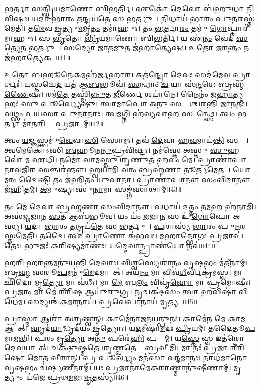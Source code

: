 \ul{𑌭}𑌰𑍍𑌤𑌾 𑌸\ul{𑌨𑍍𑌭𑍍𑌰𑌿}𑌯𑌮𑌾॑𑌣𑍋 𑌬𑌿𑌭𑌰𑍍𑌤𑌿। 
𑌏𑌕𑍋॑ \ul{𑌦𑍇}𑌵𑍋 𑌬॑\ul{𑌹𑍁}𑌧𑌾 𑌨𑌿𑌵𑌿॑𑌷𑍍𑌟𑌃। 
\ul{𑌯}𑌦𑌾 \ul{𑌭𑌾}𑌰𑌂 \ul{𑌤}𑌨𑍍𑌦𑍍𑌰𑌯॑\ul{𑌤𑍇} 𑌸 𑌭𑌰𑍍𑌤𑍁𑌮𑍍᳚। 
\ul{𑌨𑌿}𑌧𑌾𑌯॑ \ul{𑌭𑌾}𑌰𑌂 𑌪𑍁\ul{𑌨}𑌰𑌸𑍍𑌤॑𑌮𑍇𑌤𑌿। 
𑌤\ul{𑌮𑍇}𑌵 \ul{𑌮𑍃}𑌤𑍍𑌯𑍁\ul{𑌮}𑌮𑍃\ul{𑌤𑌂} 𑌤𑌮𑌾॑𑌹𑍁𑌃। 
𑌤𑌂 \ul{𑌭}𑌰𑍍𑌤𑌾\ul{𑌰𑌂} 𑌤𑌮𑍁॑ \ul{𑌗𑍋}𑌪𑍍𑌤𑌾𑌰॑𑌮𑌾𑌹𑍁𑌃। 
𑌸 \ul{𑌭𑍃}𑌤𑍋 \ul{𑌭𑍍𑌰𑌿}𑌯𑌮𑌾॑𑌣𑍋 𑌬𑌿𑌭𑌰𑍍𑌤𑌿। 
𑌯 𑌏॑\ul{𑌨𑌂} 𑌵𑍇𑌦॑ \ul{𑌸}𑌤𑍍𑌯𑍇\ul{𑌨} 𑌭𑌰𑍍𑌤𑍁𑌮𑍍᳚। 
\ul{𑌸}𑌦𑍍𑌯𑍋 \ul{𑌜𑌾}𑌤\ul{𑌮𑍁}𑌤 𑌜॑𑌹𑌾\ul{𑌤𑍍𑌯𑍇}𑌷𑌃। 
\ul{𑌉}𑌤𑍋 𑌜𑌰॑\ul{𑌨𑍍𑌤𑌂} 𑌨 𑌜॑\ul{𑌹𑌾}𑌤𑍍𑌯𑍇𑌕𑌮𑍍᳚॥41॥

\ul{𑌉}𑌤𑍋 \ul{𑌬}𑌹𑍂𑌨𑍇\ul{𑌕}𑌮𑌹॑𑌰𑍍𑌜𑌹𑌾𑌰। 
𑌅𑌤॑𑌨𑍍𑌦𑍍𑌰𑍋 \ul{𑌦𑍇}𑌵𑌃 𑌸𑌦॑\ul{𑌮𑍇}𑌵 𑌪𑍍𑌰𑌾𑌰𑍍𑌥𑌃॑। 
𑌯𑌸𑍍𑌤𑌦𑍍𑌵𑍇\ul{𑌦} 𑌯𑌤॑ 𑌆\ul{𑌬}𑌭𑍂𑌵॑। 
\ul{𑌸}𑌨𑍍𑌧𑌾𑌂 \ul{𑌚} 𑌯𑌾 𑌸॑\ul{𑌨𑍍𑌦}𑌧𑍇 𑌬𑍍𑌰𑌹𑍍𑌮॑\ul{𑌣𑍈}𑌷𑌃। 
𑌰𑌮॑\ul{𑌤𑍇} 𑌤𑌸𑍍𑌮𑌿॑\ul{𑌨𑍍𑌨𑍁}𑌤 \ul{𑌜𑍀}𑌰𑍍𑌣𑍇 𑌶𑌯𑌾॑𑌨𑍇। 
𑌨𑍈𑌨𑌂॑ 𑌜\ul{𑌹𑌾}𑌤𑍍𑌯𑌹𑌃॑ 𑌸𑍁 \ul{𑌪𑍂}𑌰𑍍𑌵𑍍𑌯𑍇𑌷𑍁॑। 
𑌤𑍍𑌵𑌾𑌮𑌾\ul{𑌪𑍋} 𑌅\ul{𑌨𑍁} 𑌸𑌰𑍍𑌵𑌾᳚𑌶𑍍𑌚𑌰𑌨𑍍𑌤𑌿 𑌜𑌾\ul{𑌨}𑌤𑍀𑌃। 
\ul{𑌵}𑌥𑍍𑌸𑌂 𑌪𑌯॑𑌸𑌾 𑌪𑍁\ul{𑌨𑌾}𑌨𑌾𑌃। 
𑌤𑍍𑌵\ul{𑌮}𑌗𑍍𑌨𑌿 𑌹॑\ul{𑌵𑍍𑌯}𑌵𑌾\ul{𑌹}\ul{} 𑌸𑌮𑌿᳚𑌨𑍍𑌥𑍍𑌸𑍇। 
𑌤𑍍𑌵𑌂 \ul{𑌭}𑌰𑍍𑌤𑌾 𑌮𑌾॑\ul{𑌤}𑌰𑌿𑌶𑍍𑌵𑌾᳚ \ul{𑌪𑍍𑌰}𑌜𑌾𑌨𑌾᳚𑌮𑍍॥42॥

𑌤𑍍𑌵𑌂 \ul{𑌯}𑌜𑍍𑌞𑌸𑍍𑌤𑍍𑌵𑌮𑍁॑\ul{𑌵𑍇}𑌵𑌾\ul{𑌸𑌿} 𑌸𑍋𑌮𑌃॑। 
𑌤𑌵॑ \ul{𑌦𑍇}𑌵𑌾 𑌹\ul{𑌵}𑌮𑌾𑌯॑\ul{𑌨𑍍𑌤𑌿} 𑌸𑌰𑍍𑌵𑍇᳚। 
𑌤𑍍𑌵𑌮𑍇𑌕𑍋॑𑌽𑌸𑌿 \ul{𑌬}𑌹𑍂𑌨\ul{𑌨𑍁}𑌪𑍍𑌰𑌵𑌿॑𑌷𑍍𑌟𑌃। 
𑌨𑌮॑𑌸𑍍𑌤𑍇 𑌅𑌸𑍍𑌤𑍁 \ul{𑌸𑍁}𑌹𑌵𑍋॑ 𑌮 𑌏𑌧𑌿। 
𑌨𑌮𑍋॑ 𑌵𑌾𑌮𑌸𑍍𑌤𑍁 𑌶𑍃\ul{𑌣𑍁}𑌤 𑌹𑌵𑌂॑ 𑌮𑍇। 
𑌪𑍍𑌰𑌾𑌣𑌾॑𑌪𑌾𑌨𑌾𑌵\ul{𑌜𑌿}𑌰 \ul{𑌸}𑌞𑍍𑌚𑌰॑𑌨𑍍𑌤𑍗। 
𑌹𑍍𑌵𑌯𑌾॑𑌮𑌿 \ul{𑌵𑌾𑌂} 𑌬𑍍𑌰𑌹𑍍𑌮॑𑌣𑌾 \ul{𑌤𑍂}𑌰𑍍𑌤𑌮𑍇𑌤𑌮𑍍᳚। 
𑌯𑍋 𑌮𑌾𑌂 𑌦𑍍𑌵𑍇𑍇\ul{𑌷𑍍𑌟𑌿} 𑌤𑌂 𑌜॑𑌹𑌿𑌤𑌂 𑌯𑍁𑌵𑌾𑌨𑌾। 
𑌪𑍍𑌰𑌾𑌣𑌾॑𑌪𑌾𑌨𑍗 𑌸𑌂𑌵𑌿\ul{𑌦𑌾}𑌨𑍗 𑌜॑𑌹𑌿𑌤𑌮𑍍। 
\ul{𑌅}𑌮𑍁𑌷𑍍𑌯𑌾𑌸𑍁॑\ul{𑌨𑌾}𑌮𑌾 𑌸𑌙𑍍𑌗॑𑌸𑌾𑌥𑌾𑌮𑍍॥43॥

𑌤𑌂 𑌮𑍇॑ 𑌦𑍇\ul{𑌵𑌾} 𑌬𑍍𑌰𑌹𑍍𑌮॑𑌣𑌾 𑌸𑌂𑌵𑌿\ul{𑌦𑌾}𑌨𑍗। 
\ul{𑌵}𑌧𑌾𑌯॑ 𑌦\ul{𑌤𑍍𑌤𑌂} 𑌤\ul{𑌮}𑌹 𑌹॑𑌨𑌾𑌮𑌿। 
𑌅𑌸॑𑌜𑍍𑌜𑌜𑌾𑌨 \ul{𑌸}𑌤 𑌆𑌬॑𑌭𑍂𑌵। 
𑌯𑌂 𑌯𑌂॑ \ul{𑌜}𑌜𑌾\ul{𑌨} 𑌸 𑌉॑ \ul{𑌗𑍋}𑌪𑍋 𑌅॑𑌸𑍍𑌯। 
\ul{𑌯}𑌦𑌾 \ul{𑌭𑌾}𑌰𑌂 \ul{𑌤}𑌨𑍍𑌦𑍍𑌰𑌯॑\ul{𑌤𑍇} 𑌸 𑌭𑌰𑍍𑌤𑍁𑌮𑍍᳚। 
\ul{𑌪}𑌰𑌾𑌸𑍍𑌯॑ \ul{𑌭𑌾}𑌰𑌂 𑌪𑍁\ul{𑌨}𑌰𑌸𑍍𑌤॑𑌮𑍇𑌤𑌿। 
𑌤𑌦𑍍𑌵𑍈 𑌤𑍍𑌵𑌂 \ul{𑌪𑍍𑌰𑌾}𑌣𑍋 𑌅॑𑌭𑌵𑌃। 
\ul{𑌮}𑌹𑌾𑌨𑍍𑌭𑍋𑌗𑌃॑ \ul{𑌪𑍍𑌰}𑌜𑌾𑌪॑𑌤𑍇𑌃। 
𑌭𑍁𑌜𑌃॑ 𑌕\ul{𑌰𑌿}𑌷𑍍𑌯𑌮𑌾॑𑌣𑌃। 
𑌯\ul{𑌦𑍍𑌦𑍇}𑌵𑌾𑌨𑍍𑌪𑍍𑌰𑌾𑌣॑\ul{𑌯𑍋} 𑌨𑌵॑॥44॥
\anuvakamend[𑌏𑌕𑌂॑ \ul{𑌪𑍍𑌰}𑌜𑌾𑌨𑌾᳚𑌙𑍍𑌗𑌸𑌾\ul{𑌥𑌾𑌂} 𑌨𑌵॑]

𑌹\ul{𑌰𑌿}\ul{} 𑌹𑌰॑\ul{𑌨𑍍𑌤}𑌮𑌨𑍁॑𑌯𑌨𑍍𑌤𑌿 \ul{𑌦𑍇}𑌵𑌾𑌃। 
𑌵𑌿\ul{𑌶𑍍𑌵}𑌸𑍍𑌯𑍇𑌶𑌾॑𑌨𑌂 𑌵𑍃\ul{𑌷}𑌭𑌂 𑌮॑\ul{𑌤𑍀}𑌨𑌾𑌮𑍍। 
𑌬𑍍𑌰\ul{𑌹𑍍𑌮} 𑌸𑌰𑍂॑\ul{𑌪}𑌮𑌨𑍁॑\ul{𑌮𑍇}𑌦𑌮𑌾𑌗𑌾᳚𑌤𑍍। 
𑌅𑌯॑\ul{𑌨𑌂} 𑌮𑌾 𑌵𑌿𑌵॑\ul{𑌧𑍀}𑌰𑍍𑌵𑌿𑌕𑍍𑌰॑𑌮𑌸𑍍𑌵। 
𑌮𑌾 𑌛𑌿॑𑌦𑍋 𑌮𑍃\ul{𑌤𑍍𑌯𑍋} 𑌮𑌾 𑌵॑𑌧𑍀𑌃। 
𑌮𑌾 \ul{𑌮𑍇} 𑌬\ul{𑌲𑌂}  𑌵𑌿𑌵𑍃॑\ul{𑌹𑍋} 𑌮𑌾 𑌪𑍍𑌰𑌮𑍋॑𑌷𑍀𑌃। 
\ul{𑌪𑍍𑌰}𑌜𑌾𑌂 𑌮𑌾 𑌮𑍇॑ 𑌰𑍀𑌰𑌿\ul{𑌷} 𑌆𑌯𑍁॑𑌰𑍁𑌗𑍍𑌰। 
\ul{𑌨𑍃}𑌚𑌕𑍍𑌷॑𑌸𑌂 𑌤𑍍𑌵𑌾 \ul{𑌹}𑌵𑌿𑌷𑌾॑ 𑌵𑌿𑌧𑍇𑌮। 
\ul{𑌸}𑌦𑍍𑌯𑌶𑍍𑌚॑𑌕\ul{𑌮𑌾}𑌨𑌾𑌯॑। 
\ul{𑌪𑍍𑌰}\ul{𑌵𑍇}\ul{𑌪𑌾}𑌨𑌾𑌯॑ \ul{𑌮𑍃}𑌤𑍍𑌯𑌵𑍇᳚॥45॥

𑌪𑍍𑌰𑌾\ul{𑌸𑍍𑌮𑌾} 𑌆𑌶𑌾॑ 𑌅𑌶𑍃𑌣𑍍𑌵𑌨𑍍। 
𑌕𑌾𑌮𑍇॑𑌨𑌾𑌜𑌨\ul{𑌯}𑌨𑍍𑌪𑍁𑌨𑌃॑। 
𑌕𑌾𑌮𑍇॑𑌨 \ul{𑌮𑍇} 𑌕𑌾\ul{𑌮} 𑌆𑌗𑌾᳚𑌤𑍍। 
𑌹𑍃𑌦॑\ul{𑌯𑌾}𑌦𑍍𑌧𑍃𑌦॑𑌯𑌂 \ul{𑌮𑍃}𑌤𑍍𑌯𑍋𑌃। 
𑌯\ul{𑌦}𑌮𑍀𑌷𑌾॑\ul{𑌮}𑌦𑌃 \ul{𑌪𑍍𑌰𑌿}𑌯𑌮𑍍। 
𑌤𑌦𑍈𑌤𑍂\ul{𑌪}𑌮𑌾\ul{𑌮}𑌭𑌿। 
𑌪𑌰𑌂॑ 𑌮𑍃\ul{𑌤𑍍𑌯𑍋} 𑌅\ul{𑌨𑍁} 𑌪𑌰𑍇॑\ul{𑌹𑌿} 𑌪𑌨𑍍𑌥𑌾᳚𑌮𑍍। 
𑌯\ul{𑌸𑍍𑌤𑍇} 𑌸𑍍𑌵 𑌇𑌤॑𑌰𑍋 𑌦𑍇\ul{𑌵}𑌯𑌾𑌨𑌾᳚𑌤𑍍। 
𑌚𑌕𑍍𑌷𑍁॑𑌷𑍍𑌮𑌤𑍇 𑌶𑍃\ul{𑌣𑍍𑌵}𑌤𑍇 𑌤𑍇᳚ 𑌬𑍍𑌰𑌵𑍀𑌮𑌿। 
𑌮𑌾 𑌨𑌃॑ \ul{𑌪𑍍𑌰}𑌜𑌾 𑌰𑍀॑𑌰𑌿\ul{𑌷𑍋} 𑌮𑍋𑌤 \ul{𑌵𑍀}𑌰𑌾𑌨𑍍। 
𑌪𑍍𑌰 \ul{𑌪𑍂}𑌰𑍍𑌵𑍍𑌯𑌂 𑌮𑌨॑\ul{𑌸𑌾} 𑌵𑌨𑍍𑌦॑𑌮𑌾𑌨𑌃। 
𑌨𑌾𑌧॑𑌮𑌾𑌨𑍋 𑌵𑍃\ul{𑌷}𑌭𑌂 𑌚॑𑌰𑍍\mbox{}𑌷\ul{𑌣𑍀}𑌨𑌾𑌮𑍍। 
𑌯𑌃 \ul{𑌪𑍍𑌰}𑌜𑌾𑌨𑌾॑𑌮𑍇\ul{𑌕}𑌰𑌾𑌣𑍍𑌮𑌾𑌨𑍁॑𑌷𑍀𑌣𑌾𑌮𑍍। 
\ul{𑌮𑍃}𑌤𑍍𑌯𑍁𑌂 𑌯॑𑌜𑍇 𑌪𑍍𑌰𑌥\ul{𑌮}𑌜𑌾\ul{𑌮𑍃}𑌤𑌸𑍍𑌯॑॥46॥
\anuvakamend[\ul{𑌮𑍃}𑌤𑍍𑌯𑌵𑍇॑ \ul{𑌵𑍀}𑌰𑌾\dng{ꣳ}\ul{𑌶𑍍𑌚}𑌤𑍍𑌵𑌾𑌰𑌿॑ 𑌚]

